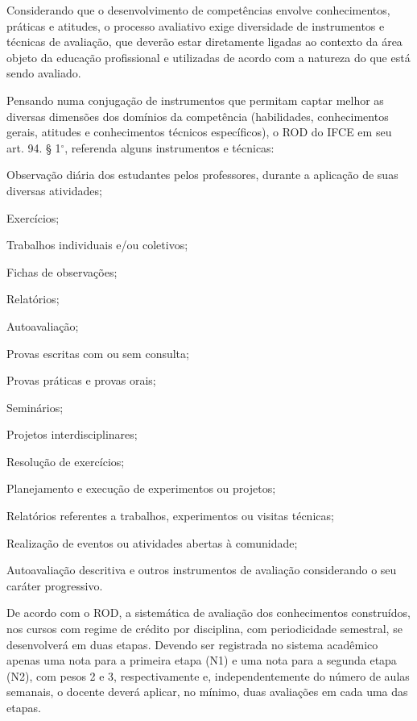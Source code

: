 \documentclass[
	12pt,				%
	openright,			%
	twoside,			%
	a4paper,			%
	chapter=TITLE,		%
	english,			%
	french,				%
	spanish,			%
	brazil,				%
	]{abntex2}
\begin{document}
Considerando que o desenvolvimento de competências envolve conhecimentos, práticas e atitudes, o processo avaliativo exige diversidade de instrumentos e técnicas de avaliação, que deverão estar diretamente ligadas ao contexto da área objeto da educação profissional e utilizadas de acordo com a natureza do que está sendo avaliado.

Pensando numa conjugação de instrumentos que permitam captar melhor as diversas dimensões dos domínios da competência (habilidades, conhecimentos gerais, atitudes e conhecimentos técnicos específicos), o ROD do IFCE em seu art. 94. § 1$^\circ$, referenda alguns instrumentos e técnicas:

\begin{alineas}
\item  Observação diária dos estudantes pelos professores, durante a aplicação de suas diversas atividades;  
\item  Exercícios;
\item Trabalhos individuais e/ou coletivos;
\item Fichas de observações;
\item Relatórios;
\item Autoavaliação;
\item Provas escritas com ou sem consulta;
\item  Provas práticas e provas orais;
\item  Seminários;
\item  Projetos interdisciplinares;
\item Resolução de exercícios;
\item Planejamento e execução de experimentos ou projetos;
\item Relatórios referentes a trabalhos, experimentos ou visitas técnicas;
\item Realização de eventos ou atividades abertas à comunidade;
\item Autoavaliação descritiva e outros instrumentos de avaliação considerando o seu caráter progressivo. 

\end{alineas}

De acordo com o ROD, a sistemática de avaliação dos conhecimentos construídos, nos cursos com regime de crédito por disciplina, com periodicidade semestral, se desenvolverá em duas etapas. Devendo ser registrada no sistema acadêmico apenas uma nota para a primeira etapa (N1) e uma nota para a segunda etapa (N2), com pesos 2 e 3, respectivamente e, independentemente do número de aulas semanais, o docente deverá aplicar, no mínimo, duas avaliações em cada uma das etapas.
\end{document}
